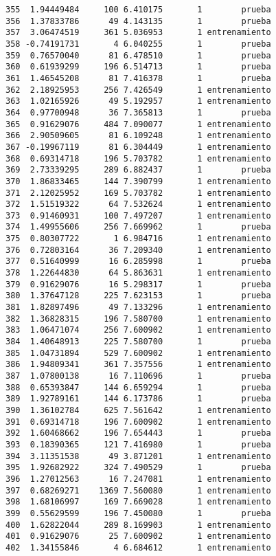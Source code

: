 \documentclass[
  letterpaper,
  DIV=11,
  numbers=noendperiod]{scrreprt}
\begin{document}
\begin{verbatim}
355  1.94449484     100 6.410175       1        prueba
356  1.37833786      49 4.143135       1        prueba
357  3.06474519     361 5.036953       1 entrenamiento
358 -0.74191731       4 6.040255       1        prueba
359  0.76570040      81 6.478510       1        prueba
360  0.61939299     196 6.514713       1        prueba
361  1.46545208      81 7.416378       1        prueba
362  2.18925953     256 7.426549       1 entrenamiento
363  1.02165926      49 5.192957       1 entrenamiento
364  0.97700948      36 7.365813       1        prueba
365  0.91629076     484 7.090077       1 entrenamiento
366  2.90509605      81 6.109248       1 entrenamiento
367 -0.19967119      81 6.304449       1 entrenamiento
368  0.69314718     196 5.703782       1 entrenamiento
369  2.73339295     289 6.882437       1        prueba
370  1.86833465     144 7.390799       1 entrenamiento
371  2.12025952     169 5.703782       1 entrenamiento
372  1.51519322      64 7.532624       1 entrenamiento
373  0.91460931     100 7.497207       1 entrenamiento
374  1.49955606     256 7.669962       1        prueba
375  0.80307722       1 6.984716       1 entrenamiento
376  0.72803164      36 7.209340       1 entrenamiento
377  0.51640999      16 6.285998       1        prueba
378  1.22644830      64 5.863631       1 entrenamiento
379  0.91629076      16 5.298317       1        prueba
380  1.37647128     225 7.623153       1        prueba
381  1.82897496      49 7.133296       1 entrenamiento
382  1.36828315     196 7.580700       1 entrenamiento
383  1.06471074     256 7.600902       1 entrenamiento
384  1.40648913     225 7.580700       1        prueba
385  1.04731894     529 7.600902       1 entrenamiento
386  1.94809341     361 7.357556       1 entrenamiento
387  1.07800138      16 7.110696       1        prueba
388  0.65393847     144 6.659294       1        prueba
389  1.92789161     144 6.173786       1        prueba
390  1.36102784     625 7.561642       1 entrenamiento
391  0.69314718     196 7.600902       1 entrenamiento
392  1.60468662     196 7.654443       1        prueba
393  0.18390365     121 7.416980       1        prueba
394  3.11351538      49 3.871201       1 entrenamiento
395  1.92682922     324 7.490529       1        prueba
396  1.27012563      16 7.247081       1 entrenamiento
397  0.68269271    1369 7.560080       1 entrenamiento
398  1.68106997     169 7.669028       1 entrenamiento
399  0.55629599     196 7.450080       1        prueba
400  1.62822044     289 8.169903       1 entrenamiento
401  0.91629076      25 7.600902       1 entrenamiento
402  1.34155846       4 6.684612       1 entrenamiento

\end{verbatim}
\end{document}

